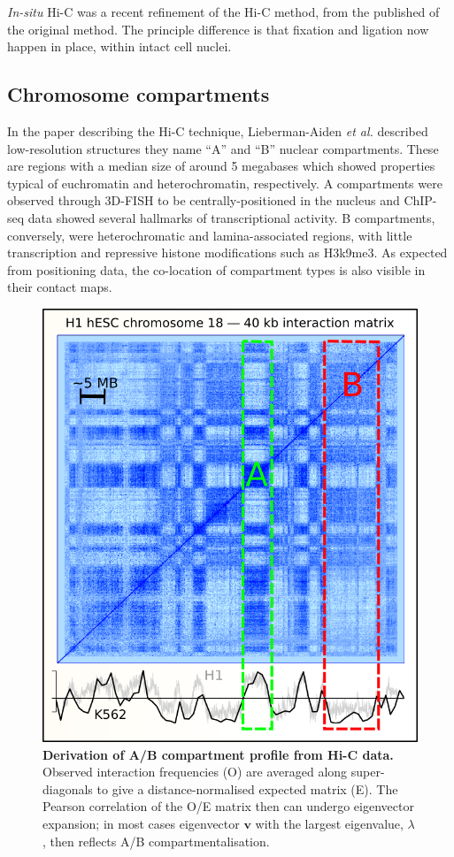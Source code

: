 \documentclass[a4paper,11pt,oneside]{book}
\begin{document}
\emph{In-situ} Hi-C was a recent refinement of the Hi-C method, from the published of the original method.\cite{Rao2014} The principle difference is that fixation and ligation now happen in place, within intact cell nuclei.

\subsection{Chromosome compartments}\label{sec:compartments}

In the paper describing the Hi-C technique,\cite{Lieberman2009}  Lieberman-Aiden \emph{et
  al.} described low-resolution structures they name  ``A'' and ``B'' nuclear compartments. These are regions with a median size of around 5 megabases which showed properties typical
of euchromatin and heterochromatin, respectively. A compartments were observed through 3D-FISH to be centrally-positioned in the nucleus and  ChIP-seq data showed several hallmarks of transcriptional activity. B compartments, conversely, were heterochromatic and lamina-associated regions, with little transcription and repressive histone modifications such as H3k9me3.\cite{Lieberman2009, DeWit2012} As expected from positioning data, the co-location of compartment types is also visible in their contact maps. 

\begin{figure}
\begin{center}
\includegraphics[width=.75\textwidth]{figs/eigcalc.png}
\captionsetup{width=\textwidth}
\caption[Derivation of A/B compartment profile from Hi-C data.]{ {\bf Derivation of A/B compartment profile from Hi-C data.} 
Observed interaction frequencies (O) are averaged along super-diagonals to give a distance-normalised expected matrix (E). The Pearson correlation of the O/E matrix then can undergo eigenvector expansion; in most cases eigenvector $\mathbf{v}$ with the largest eigenvalue, $\lambda$, then reflects A/B compartmentalisation.\cite{Lieberman2009}
}\label{fig:eigcalc}
\end{center}
\end{figure} 
\end{document}
